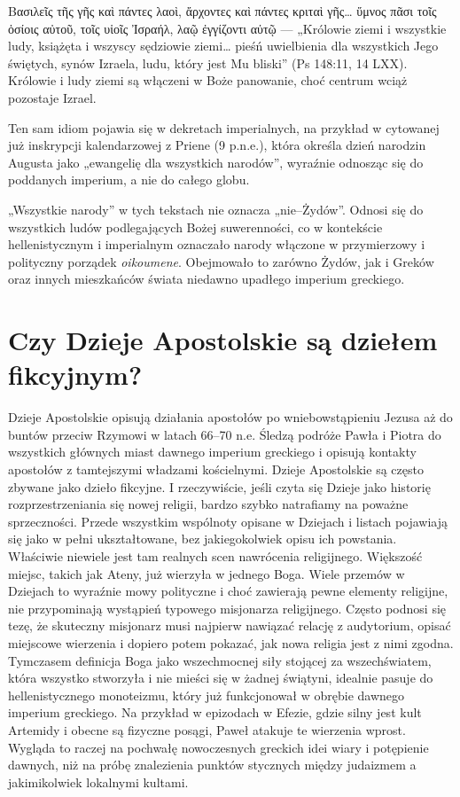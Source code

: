 Βασιλεῖς τῆς γῆς καὶ πάντες λαοὶ, ἄρχοντες καὶ πάντες κριταὶ γῆς… ὕμνος πᾶσι τοῖς ὁσίοις αὐτοῦ, τοῖς υἱοῖς Ἰσραήλ, λαῷ ἐγγίζοντι αὐτῷ --- „Królowie ziemi i wszystkie ludy, książęta i wszyscy sędziowie ziemi… pieśń uwielbienia dla wszystkich Jego świętych, synów Izraela, ludu, który jest Mu bliski” (Ps 148:11, 14 LXX).
Królowie i ludy ziemi są włączeni w Boże panowanie, choć centrum wciąż pozostaje Izrael.

Ten sam idiom pojawia się w dekretach imperialnych, na przykład w cytowanej już inskrypcji kalendarzowej z Priene (9 p.n.e.), która określa dzień narodzin Augusta jako „ewangelię dla wszystkich narodów”, wyraźnie odnosząc się do poddanych imperium, a nie do całego globu.

„Wszystkie narody” w tych tekstach nie oznacza „nie–Żydów”.
Odnosi się do wszystkich ludów podlegających Bożej suwerenności, co w kontekście hellenistycznym i imperialnym oznaczało narody włączone w przymierzowy i polityczny porządek \textit{oikoumene}.
Obejmowało to zarówno Żydów, jak i Greków oraz innych mieszkańców świata niedawno upadłego imperium greckiego.

\section{Czy Dzieje Apostolskie są dziełem fikcyjnym?}\label{sec:are-acts-a-work-of-fiction}

Dzieje Apostolskie opisują działania apostołów po wniebowstąpieniu Jezusa aż do buntów przeciw Rzymowi w latach 66–70 n.e.
Śledzą podróże Pawła i Piotra do wszystkich głównych miast dawnego imperium greckiego i opisują kontakty apostołów z tamtejszymi władzami kościelnymi.
Dzieje Apostolskie są często zbywane jako dzieło fikcyjne.
I rzeczywiście, jeśli czyta się Dzieje jako historię rozprzestrzeniania się nowej religii, bardzo szybko natrafiamy na poważne sprzeczności.
Przede wszystkim wspólnoty opisane w Dziejach i listach pojawiają się jako w pełni ukształtowane, bez jakiegokolwiek opisu ich powstania.
Właściwie niewiele jest tam realnych scen nawrócenia religijnego.
Większość miejsc, takich jak Ateny, już wierzyła w jednego Boga.
Wiele przemów w Dziejach to wyraźnie mowy polityczne i choć zawierają pewne elementy religijne, nie przypominają wystąpień typowego misjonarza religijnego.
Często podnosi się tezę, że skuteczny misjonarz musi najpierw nawiązać relację z audytorium, opisać miejscowe wierzenia i dopiero potem pokazać, jak nowa religia jest z nimi zgodna.
Tymczasem definicja Boga jako wszechmocnej siły stojącej za wszechświatem, która wszystko stworzyła i nie mieści się w żadnej świątyni, idealnie pasuje do hellenistycznego monoteizmu, który już funkcjonował w obrębie dawnego imperium greckiego.
Na przykład w epizodach w Efezie, gdzie silny jest kult Artemidy i obecne są fizyczne posągi, Paweł atakuje te wierzenia wprost.
Wygląda to raczej na pochwałę nowoczesnych greckich idei wiary i potępienie dawnych, niż na próbę znalezienia punktów stycznych między judaizmem a jakimikolwiek lokalnymi kultami.

